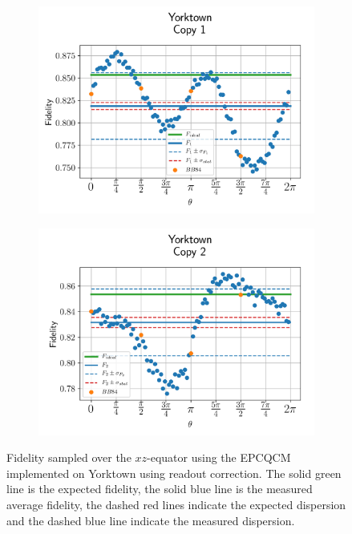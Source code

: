 \begin{figure}[H]
  \centering
  \begin{subfigure}{.5\textwidth}
    \centering
    \includegraphics[width=\textwidth]{Figures/Economical/IBM/OnlyEquator/results_ibmqx2_copy1.png}
    \label{fig:epc_uncorrected_yorktown_equator_1}
  \end{subfigure}%
  \begin{subfigure}{.5\textwidth}
    \centering
    \includegraphics[width=\textwidth]{Figures/Economical/IBM/OnlyEquator/results_ibmqx2_copy2.png}
    \label{fig:epc_uncorrected_yorktown_equator_2}
  \end{subfigure}
  \vspace{-0.5cm}
  \caption{Fidelity sampled over the $xz$-equator using the EPCQCM implemented on Yorktown using readout correction. The solid green line is the expected fidelity, the solid blue line is the measured average fidelity, the dashed red lines indicate the expected dispersion and the dashed blue line indicate the measured dispersion.}
  \label{fig:epc_uncorrected_yorktown_equator}
\end{figure}
